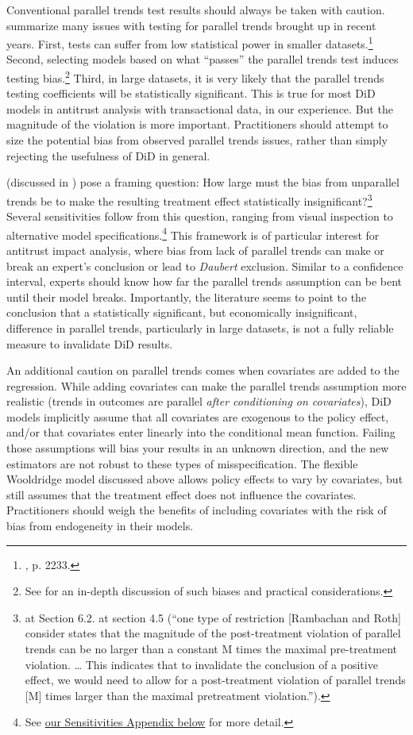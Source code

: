 \documentclass[12pt]{article}
\begin{document}
Conventional parallel trends test results should always be taken with caution. \citet{roth2023s} summarize many issues with testing for parallel trends brought up in recent years. First, tests can suffer from low statistical power in smaller datasets.\footnote{\citet{roth2023s}, p. 2233.}  Second, selecting models based on what “passes” the parallel trends test induces testing bias.\footnote{See \citet{roth2022a} for an in-depth discussion of such biases and practical considerations.}  Third, in large datasets, it is very likely that the parallel trends testing coefficients will be statistically significant. This is true for most DiD models in antitrust analysis with transactional data, in our experience. But the magnitude of the violation is more important. Practitioners should attempt to size the potential bias from observed parallel trends issues, rather than simply rejecting the usefulness of DiD in general. 

\citet{rambachan2023more} (discussed in \citet{roth2023s}) pose a framing question: How large must the bias from unparallel trends be to make the resulting treatment effect statistically insignificant?\footnote{\citet{rambachan2023more} at Section 6.2. \citet{roth2023s} at section 4.5 (“one type of restriction [Rambachan and Roth] consider states that the magnitude of the post-treatment violation of parallel trends can be no larger than a constant M times the maximal pre-treatment violation. … This indicates that to invalidate the conclusion of a positive effect, we would need to allow for a post-treatment violation of parallel trends [M] times larger than the maximal pretreatment violation.”).}  Several sensitivities follow from this question, ranging from visual inspection to alternative model specifications.\footnote{See \hyperref[sec:appendixa]{our Sensitivities Appendix below} for more detail.}  This framework is of particular interest for antitrust impact analysis, where bias from lack of parallel trends can make or break an expert’s conclusion or lead to \textit{Daubert} exclusion. Similar to a confidence interval, experts should know how far the parallel trends assumption can be bent until their model breaks. Importantly, the literature seems to point to the conclusion that a statistically significant, but economically insignificant, difference in parallel trends, particularly in large datasets, is not a fully reliable measure to invalidate DiD results.

An additional caution on parallel trends comes when covariates are added to the regression. While adding covariates can make the parallel trends assumption more realistic (trends in outcomes are parallel \textit{after conditioning on covariates}), DiD models implicitly assume that all covariates are exogenous to the policy effect, and/or that covariates enter linearly into the conditional mean function. Failing those assumptions will bias your results in an unknown direction, and the new estimators are not robust to these types of misspecification. The flexible Wooldridge model discussed above allows policy effects to vary by covariates, but still assumes that the treatment effect does not influence the covariates. Practitioners should weigh the benefits of including covariates with the risk of bias from endogeneity in their models.
\end{document}
